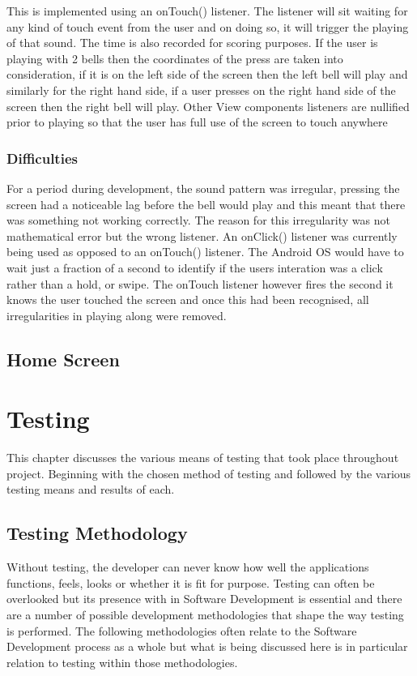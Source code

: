 \documentclass{l4proj}
\begin{document}
This is implemented using an onTouch() listener.  The listener will sit waiting for any kind of touch event from the user and on doing so, it will trigger the playing of that sound.  The time is also recorded for scoring purposes.  If the user is playing with 2 bells then the coordinates of the press are taken into consideration, if it is on the left side of the screen then the left bell will play and similarly for the right hand side, if a user presses on the right hand side of the screen then the right bell will play.  Other View components listeners are nullified prior to playing so that the user has full use of the screen to touch anywhere

\subsection{Difficulties}
For a period during development, the sound pattern was irregular, pressing the screen had a noticeable lag before the bell would play and this meant that there was something not working correctly.  The reason for this irregularity was not mathematical error but the wrong listener.  An onClick() listener was currently being used as opposed to an onTouch() listener.  The Android OS would have to wait just a fraction of a second to identify if the users interation was a click rather than a hold, or swipe.  The onTouch listener however fires the second it knows the user touched the screen and once this had been recognised, all irregularities in playing along were removed. 


\section{Home Screen}

\chapter{Testing}
This chapter discusses the various means of testing that took place throughout project. Beginning with the chosen method of testing and followed by the various testing means and results of each. 

\section{Testing Methodology}
Without testing, the developer can never know how well the applications functions, feels, looks or whether it is fit for purpose. Testing can often be overlooked but its presence with in Software Development is essential and there are a number of possible development methodologies that shape the way testing is performed.  The following methodologies often relate to the Software Development process as a whole but what is being discussed here is in particular relation to testing within those methodologies.
\end{document}
